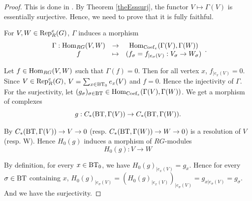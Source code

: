 \documentclass[a4paper,10pt]{amsart}
\begin{document}
\begin{proof}
This is done in \cite[Cor (2.1.11)]{Wanga}. By Theorem \ref{theEsssurj}, the functor $V  \mapsto  \Gamma(V)$ is essentially surjective. Hence, we need to prove that it is fully faithful.

For $V,W \in \rep[R][e]{G}$, $\Gamma$ induces a morphism
\[\begin{array}{ccc}
\Gamma :  \operatorname{Hom}_{RG}(V,W) & \to & \operatorname{Hom}_{\operatorname{Coef}_e}(\Gamma(V),\Gamma(W)) \\
 f & \mapsto & (f_\sigma=f_{|e_\sigma(V)} : V_\sigma \to W_\sigma) \\
\end{array}.\]

Let $f \in \operatorname{Hom}_{RG}(V,W)$ such that $\Gamma(f)=0$. Then for all vertex $x$, $f_{|e_x(V)}=0$. Since $V \in \rep[R][e]{G}$, $V=\sum_{x \in \bts} e_x(V)$ and $f=0$. Hence the injectivity of $\Gamma$. For the surjectivity, let $(g_\sigma)_{\sigma \in \bt} \in \Hom_{\Coef_e}(\Gamma(V),\Gamma(W))$. We get a morphism of complexes
\[
	g : C_{*}(\bt,\Gamma(V)) \to C_{*}(\bt,\Gamma(W)).
\]

By \cite[Thm. 2.4]{meyer_resolutions_2010} $C_{*}(\bt,\Gamma(V)) \to V \to 0$ (resp. $C_{*}(\bt,\Gamma(W)) \to W \to 0$) is a resolution of $V$ (resp. W). Hence $H_0(g)$ induces a morphism of $RG$-modules
\[
	H_0(g) : V \to W
\]

By definition, for every $x \in \bts$, we have $H_0(g)_{|e_x(V)}=g_x$. Hence for every $\sigma \in \bt$ containing $x$, $H_0(g)_{|e_\sigma(V)}=(H_0(g)_{|e_x(V)})_{|e_\sigma(V)}=g_{x|e_\sigma(V)}=g_\sigma$. And we have the surjectivity.
\end{proof}


%


\end{document}

